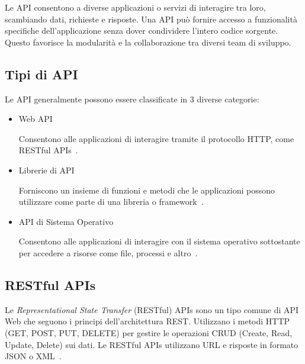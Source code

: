 Le API consentono a diverse applicazioni o servizi di interagire tra loro, scambiando dati, richieste e risposte. Una API può fornire accesso a funzionalità specifiche dell'applicazione senza dover condividere l'intero codice sorgente. Questo favorisce la modularità e la collaborazione tra diversi team di sviluppo.

\subsection{Tipi di API}
Le API generalmente possono essere classificate in 3 diverse categorie:
\begin{itemize}
    \item Web API
    
    Consentono alle applicazioni di interagire tramite il protocollo HTTP, come RESTful APIs~\cite{API_WEB}.

    \item Librerie di API
    
    Forniscono un insieme di funzioni e metodi che le applicazioni possono utilizzare come parte di una libreria o framework~\cite{API_library}.

    \item API di Sistema Operativo
    
    Consentono alle applicazioni di interagire con il sistema operativo sottostante per accedere a risorse come file, processi e altro~\cite{API_SO}.

\end{itemize}

\subsection{RESTful APIs}
Le \emph{Representational State Transfer} (RESTful) APIs sono un tipo comune di API Web che seguono i principi dell'architettura REST. Utilizzano i metodi HTTP (GET, POST, PUT, DELETE) per gestire le operazioni CRUD (Create, Read, Update, Delete) sui dati. Le RESTful APIs utilizzano URL e risposte in formato JSON o XML~\cite{REST, REST2, ALL_WEB}.

